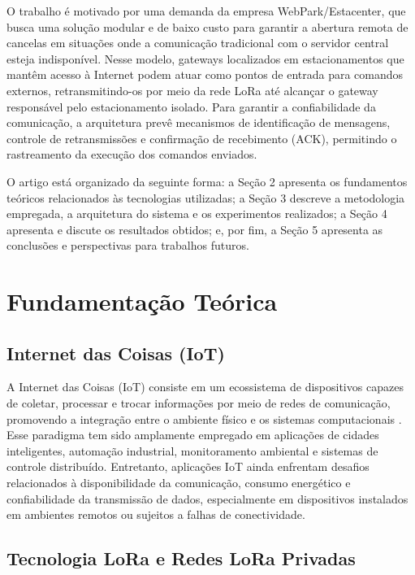 \documentclass[
article,            %
11pt,               %
twoside,            %
a4paper,            %
section=TITLE,      %
onecolumn,          %
english,            %
brazil,             %
sumario=tradicional
]{abntex2}
\begin{document}
O trabalho é motivado por uma demanda da empresa WebPark/Estacenter, que busca uma solução modular e de baixo custo para garantir a abertura remota de cancelas em situações onde a comunicação tradicional com o servidor central esteja indisponível. Nesse modelo, gateways localizados em estacionamentos que mantêm acesso à Internet podem atuar como pontos de entrada para comandos externos, retransmitindo-os por meio da rede LoRa até alcançar o gateway responsável pelo estacionamento isolado. Para garantir a confiabilidade da comunicação, a arquitetura prevê mecanismos de identificação de mensagens, controle de retransmissões e confirmação de recebimento (ACK), permitindo o rastreamento da execução dos comandos enviados.

O artigo está organizado da seguinte forma: a Seção 2 apresenta os fundamentos teóricos relacionados às tecnologias utilizadas; a Seção 3 descreve a metodologia empregada, a arquitetura do sistema e os experimentos realizados; a Seção 4 apresenta e discute os resultados obtidos; e, por fim, a Seção 5 apresenta as conclusões e perspectivas para trabalhos futuros.
\section{Fundamentação Teórica}

\subsection{Internet das Coisas (IoT)}

A Internet das Coisas (IoT) consiste em um ecossistema de dispositivos capazes de coletar, processar e trocar informações por meio de redes de comunicação, promovendo a integração entre o ambiente físico e os sistemas computacionais \cite{lima2023}. Esse paradigma tem sido amplamente empregado em aplicações de cidades inteligentes, automação industrial, monitoramento ambiental e sistemas de controle distribuído. Entretanto, aplicações IoT ainda enfrentam desafios relacionados à disponibilidade da comunicação, consumo energético e confiabilidade da transmissão de dados, especialmente em dispositivos instalados em ambientes remotos ou sujeitos a falhas de conectividade.

\subsection{Tecnologia LoRa e Redes LoRa Privadas}
\end{document}
